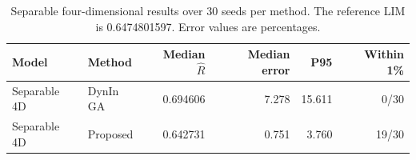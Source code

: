 \begin{table}[htbp]
\centering\small
\caption{Separable four-dimensional results over 30 seeds per method. The reference LIM is 0.6474801597. Error values are percentages.}
\label{tab:comparison-separable}
\begin{tabularx}{\linewidth}{@{}Y l r r r r@{}}
\toprule
Model & Method & Median $\hat R$ & Median error & P95 & Within 1\% \\
\midrule
Separable 4D & DynIn GA & 0.694606 & 7.278 & 15.611 & 0/30 \\
Separable 4D & Proposed & 0.642731 & 0.751 & 3.760 & 19/30 \\
\bottomrule
\end{tabularx}
\end{table}
